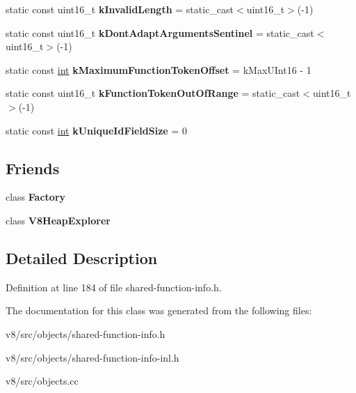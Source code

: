 \begin{DoxyCompactItemize}
static const uint16\+\_\+t {\bfseries k\+Invalid\+Length} = static\+\_\+cast$<$uint16\+\_\+t$>$(-\/1)
\item 
\mbox{\label{classv8_1_1internal_1_1SharedFunctionInfo_a50b5b53cc5dba480b9ba28740580f565}} 
static const uint16\+\_\+t {\bfseries k\+Dont\+Adapt\+Arguments\+Sentinel} = static\+\_\+cast$<$uint16\+\_\+t$>$(-\/1)
\item 
\mbox{\label{classv8_1_1internal_1_1SharedFunctionInfo_a32ad78302ef60b56964345fb334290e3}} 
static const \mbox{\hyperlink{classint}{int}} {\bfseries k\+Maximum\+Function\+Token\+Offset} = k\+Max\+U\+Int16 -\/ 1
\item 
\mbox{\label{classv8_1_1internal_1_1SharedFunctionInfo_a271354a57231d2874b207ca131d20b31}} 
static const uint16\+\_\+t {\bfseries k\+Function\+Token\+Out\+Of\+Range} = static\+\_\+cast$<$uint16\+\_\+t$>$(-\/1)
\item 
\mbox{\label{classv8_1_1internal_1_1SharedFunctionInfo_a8a0382a46019b8d44d2c8fd27a436e90}} 
static const \mbox{\hyperlink{classint}{int}} {\bfseries k\+Unique\+Id\+Field\+Size} = 0
\end{DoxyCompactItemize}
\subsection*{Friends}
\begin{DoxyCompactItemize}
\item 
\mbox{\label{classv8_1_1internal_1_1SharedFunctionInfo_a328c093d609680cca505905c6d49901a}} 
class {\bfseries Factory}
\item 
\mbox{\label{classv8_1_1internal_1_1SharedFunctionInfo_a29c5c7a1e13f0404746b9261f3764a7f}} 
class {\bfseries V8\+Heap\+Explorer}
\end{DoxyCompactItemize}


\subsection{Detailed Description}


Definition at line 184 of file shared-\/function-\/info.\+h.



The documentation for this class was generated from the following files\+:\begin{DoxyCompactItemize}
\item 
v8/src/objects/shared-\/function-\/info.\+h\item 
v8/src/objects/shared-\/function-\/info-\/inl.\+h\item 
v8/src/objects.\+cc\end{DoxyCompactItemize}
